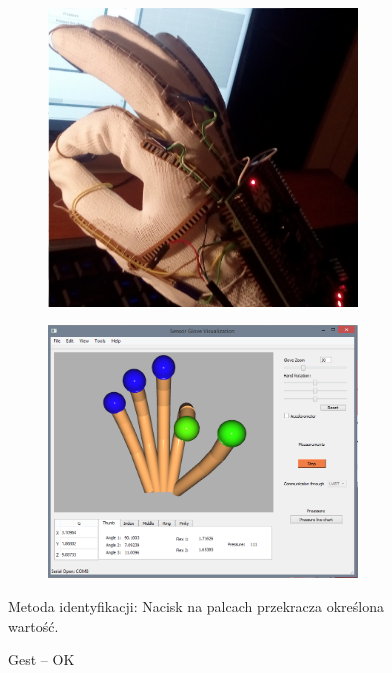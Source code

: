\documentclass[12pt,a4paper]{article}
\begin{document}
\begin{figure}[!htb]
\centering
    \begin{subfigure}{.5\textwidth}
      \includegraphics[width=0.9\textwidth]{./images/OK.jpg}
     \end{subfigure}%
    \begin{subfigure}{.5\textwidth}
      \includegraphics[width=0.9\textwidth]{./images/OKQt.png}
     \end{subfigure}
    \caption{Gest -- OK \label{fig:OK}}
\flushleft Metoda identyfikacji: Nacisk na palcach przekracza określona wartość.
\end{figure}
\end{document}
